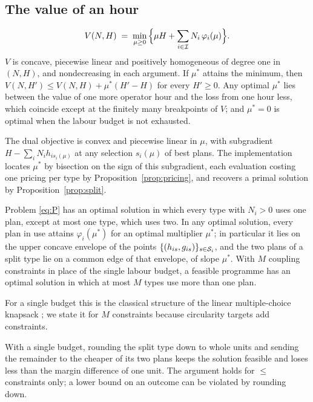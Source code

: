\subsection{The value of an hour}

\begin{proposition}\label{prop:dual}
\begin{equation}\label{eq:dual}
V(N,H)\;=\;\min_{\mu\ge0}\Big\{\mu H+\sum_{i\in\mathcal{I}}N_i\,\varphi_i(\mu)\Big\}.
\end{equation}
$V$ is concave, piecewise linear and positively homogeneous of degree one in $(N,H)$, and nondecreasing in each
argument. If $\mu^\ast$ attains the minimum, then $V(N,H')\le V(N,H)+\mu^\ast(H'-H)$ for every $H'\ge0$. Any optimal
$\mu^\ast$ lies between the value of one more operator hour and the loss from one hour less, which coincide except
at the finitely many breakpoints of $V$; and $\mu^\ast=0$ is optimal when the labour budget is not exhausted.
\end{proposition}

The dual objective is convex and piecewise linear in $\mu$, with subgradient $H-\sum_iN_ih_{is_i(\mu)}$ at any
selection $s_i(\mu)$ of best plans. The implementation locates $\mu^\ast$ by bisection on the sign of this
subgradient, each evaluation costing one pricing per type by Proposition~\ref{prop:pricing}, and recovers a primal
solution by Proposition~\ref{prop:split}.

\begin{proposition}\label{prop:split}
Problem \eqref{eq:P} has an optimal solution in which every type with $N_i>0$ uses one plan, except at most one
type, which uses two. In any optimal solution, every plan in use attains $\varphi_i(\mu^\ast)$ for an optimal
multiplier $\mu^\ast$; in particular it lies on the upper concave envelope of the points
$\{(h_{is},g_{is})\}_{s\in\mathcal{S}_i}$, and the two plans of a split type lie on a common edge of that envelope, of
slope $\mu^\ast$. With $M$ coupling constraints in place of the single labour budget, a feasible programme has an
optimal solution in which at most $M$ types use more than one plan.
\end{proposition}

For a single budget this is the classical structure of the linear multiple-choice knapsack
\citep{sinha1979,zemel1980}; we state it for $M$ constraints because circularity targets add constraints.

\begin{remark}[Integrality]\label{rem:integrality}
With a single budget, rounding the split type down to whole units and sending the remainder to the cheaper of its
two plans keeps the solution feasible and loses less than the margin difference of one unit. The argument holds for
$\le$ constraints only; a lower bound on an outcome can be violated by rounding down.
\end{remark}


